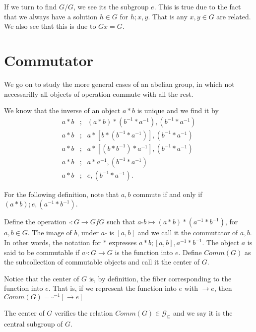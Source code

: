 \documentclass [12pt]{book}
\begin{document}
If we turn to find $G/G$, we see its the subgroup $e$. This is true due to the fact that we always have a solution $h\in G$ for $h;x,y$. That is any $x,y\in G$ are related. We also see that this is due to $Gx=G$.

	\section{Commutator}

We go on to study the more general cases of an abelian group, in which not necessarilly all objects of operation commute with all the rest.

We know that the inverse of an object $a*b$ is unique and we find it by \begin{eqnarray}\nonumber a*b&;&(a*b)*(b^{-1}*a^{-1}),(b^{-1}*a^{-1})\\\nonumber a*b&;&a*[b*(b^{-1}*a^{-1})],(b^{-1}*a^{-1})\\\nonumber a*b&;&a*[(b*b^{-1})*a^{-1}],(b^{-1}*a^{-1})\\\nonumber a*b&;&a*a^{-1},(b^{-1}*a^{-1})\\\nonumber a*b&;&e,(b^{-1}*a^{-1}).\end{eqnarray}

For the following definition, note that $a,b$ commute if and only if $(a*b);e,(a^{-1}*b^{-1})$.

\begin{definition}Define the operation $\square:G\rightarrow GfG$ such that $a\square b\mapsto(a*b)*(a^{-1}*b^{-1})$, for $a,b\in G$. The image of $b$, under $a\square$ is $[a,b]$ and we call it the commutator of $a,b$. In other words, the notation for $*$ expresses $a*b;[a,b],a^{-1}*b^{-1}$. The object $a$ is said to be commutable if $a\square:G\rightarrow G$ is the function into $e$. Define $Comm(G)$ as the subcollection of commutable objects and call it the center of $G$.\end{definition}

Notice that the center of $G$ is, by definition, the fiber corresponding to the function into $e$. That is, if we represent the function into $e$ with $\rightarrow e$, then $Comm(G)=\square^{-1}[\rightarrow e]$

\begin{proposition}The center of $G$ verifies the relation $Comm(G)\in\mathcal{G}_{\subseteq}$ and we say it is the central subgroup of $G$.\end{proposition}
\end{document}
